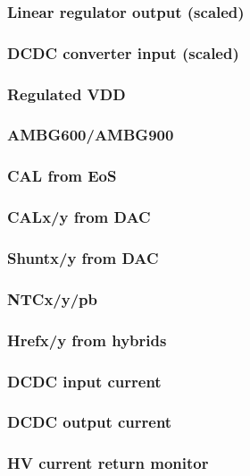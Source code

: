\documentclass[11pt]{article}   			%
\begin{document}
\subsubsection{Linear regulator output (scaled)}

\subsubsection{DCDC converter input (scaled)}

\subsubsection{Regulated VDD}

\subsubsection{AMBG600/AMBG900}

\subsubsection{CAL from EoS}

\subsubsection{CALx/y from DAC}

\subsubsection{Shuntx/y from DAC}

\subsubsection{NTCx/y/pb}

\subsubsection{Hrefx/y from hybrids}

\subsubsection{DCDC input current}

\subsubsection{DCDC output current}

\subsubsection{HV current return monitor}
\end{document}
